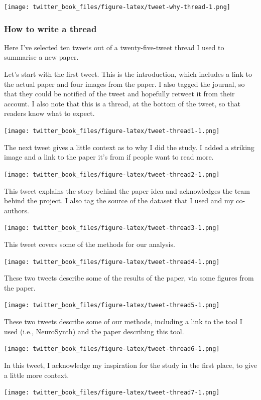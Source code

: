 \documentclass[
]{book}
\begin{document}
\texttt{[image: twitter\_book\_files/figure-latex/tweet-why-thread-1.png]}

\hypertarget{how-to-write-a-thread}{%
\subsubsection{How to write a thread}\label{how-to-write-a-thread}}

Here I've selected ten tweets out of a twenty-five-tweet thread I used to summarise a new paper.

Let's start with the first tweet. This is the introduction, which includes a link to the actual paper and four images from the paper. I also tagged the journal, so that they could be notified of the tweet and hopefully retweet it from their account. I also note that this is a thread, at the bottom of the tweet, so that readers know what to expect.

\texttt{[image: twitter\_book\_files/figure-latex/tweet-thread1-1.png]}

The next tweet gives a little context as to why I did the study. I added a striking image and a link to the paper it's from if people want to read more.

\texttt{[image: twitter\_book\_files/figure-latex/tweet-thread2-1.png]}

This tweet explains the story behind the paper idea and acknowledges the team behind the project. I also tag the source of the dataset that I used and my co-authors.

\texttt{[image: twitter\_book\_files/figure-latex/tweet-thread3-1.png]}

This tweet covers some of the methods for our analysis.

\texttt{[image: twitter\_book\_files/figure-latex/tweet-thread4-1.png]}

These two tweets describe some of the results of the paper, via some figures from the paper.

\texttt{[image: twitter\_book\_files/figure-latex/tweet-thread5-1.png]}

These two tweets describe some of our methods, including a link to the tool I used (i.e., NeuroSynth) and the paper describing this tool.

\texttt{[image: twitter\_book\_files/figure-latex/tweet-thread6-1.png]}

In this tweet, I acknowledge my inspiration for the study in the first place, to give a little more context.

\texttt{[image: twitter\_book\_files/figure-latex/tweet-thread7-1.png]}
\end{document}
